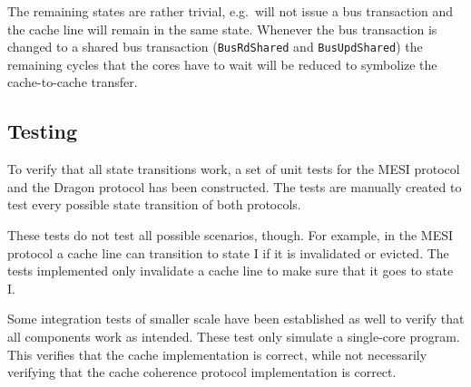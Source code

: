 



The remaining states are rather trivial, e.g.\ will not issue a bus transaction and the cache line will remain
in the same state. Whenever the bus transaction is changed to a shared bus transaction (\texttt{BusRdShared}
and \texttt{BusUpdShared}) the remaining cycles that the cores have to wait will be reduced to symbolize
the cache-to-cache transfer.

\subsection{Testing}
To verify that all state transitions work, a set of unit tests for the MESI protocol and the Dragon protocol has been constructed.
The tests are manually created to test every possible state transition of both protocols.

These tests do not test all possible scenarios, though.
For example, in the MESI protocol a cache line can transition to state I if it is invalidated or evicted.
The tests implemented only invalidate a cache line to make sure that it goes to state I.

Some integration tests of smaller scale have been established as well to verify that all components work as intended.
These test only simulate a single-core program. This verifies that the cache
implementation is correct, while not necessarily verifying that the cache coherence protocol
implementation is correct.
